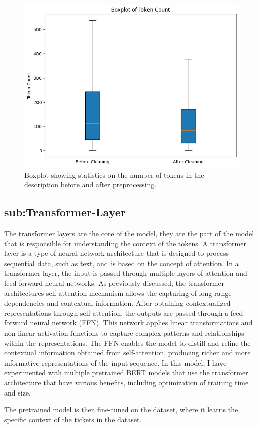 \documentclass{UoYCSproject}
\begin{document}
    \begin{figure}[h]
        \includegraphics[width=\textwidth]{./figures/tokencount-prepost}
        \caption{Boxplot showing statistics on the number of tokens in the description before and after preprocessing.}
        \label{fig:token-boxplot}
    \end{figure}


    \subsection[Transformer Layer]{sub:Transformer-Layer}
    The transformer layers are the core of the model, they are the part of the model that is responsible for understanding the context of the tokens.
    A transformer layer is a type of neural network architecture that is designed to process sequential data, such as text, and is based on the concept of attention.
    In a transformer layer, the input is passed through multiple layers of attention and feed forward neural networks.
    As previously discussed, the transformer architectures self attention mechanism allows the capturing of long-range dependencies and contextual information.
    After obtaining contextualized representations through self-attention, the outputs are passed through a feed-forward neural network (FFN).
    This network applies linear transformations and non-linear activation functions to capture complex patterns and relationships within the representations.
    The FFN enables the model to distill and refine the contextual information obtained from self-attention, producing richer and more informative representations of the input sequence.
    In this model, I have experimented with multiple pretrained BERT models that use the transformer architecture that have various benefits, including optimization of training time and size. \par
    The pretrained model is then fine-tuned on the dataset, where it learns the specific context of the tickets in the dataset.
\end{document}

